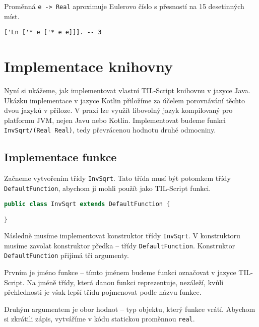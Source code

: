 Proměnná \lstinline{e -> Real} aproximuje Eulerovo číslo s přesností na 15 desetinných míst.

\begin{lstlisting}[caption={Ukázka využití proměnné e}]
['Ln ['* e ['* e e]]]. -- 3
\end{lstlisting}

\section{Implementace knihovny}

Nyní si ukážeme, jak implementovat vlastní TIL-Script knihovnu v jazyce Java. Ukázku implementace
v jazyce Kotlin přiložíme za účelem porovnávání těchto dvou jazyků v příloze. V praxi lze využít
libovolný jazyk kompilovaný pro platformu JVM, nejen Javu nebo Kotlin. Implementovat budeme funkci
\lstinline{InvSqrt/(Real Real)}, tedy převrácenou hodnotu druhé odmocniny.

\subsection{Implementace funkce}

Začneme vytvořením třídy \lstinline{InvSqrt}. Tato třída musí být potomkem třídy
\lstinline{DefaultFunction}, abychom ji mohli použít jako TIL-Script funkci.

\begin{lstlisting}[caption={Třída InvSqrt}, language=Java]
public class InvSqrt extends DefaultFunction {

}
\end{lstlisting}

Následně musíme implementovat konstruktor třídy \lstinline{InvSqrt}. V konstruktoru musíme zavolat
konstruktor předka -- třídy \lstinline{DefaultFunction}. Konstruktor \lstinline{DefaultFunction}
přijímá tři argumenty.

Prvním je jméno funkce -- tímto jménem budeme funkci označovat v jazyce TIL-Script. Na jméně třídy,
která danou funkci reprezentuje, nezáleží, kvůli přehlednosti je však lepší třídu pojmenovat podle
názvu funkce.

Druhým argumentem je obor hodnot -- typ objektu, který funkce vrátí. Abychom si zkrátili zápis,
vytváříme v kódu statickou proměnnou \lstinline{real}.

